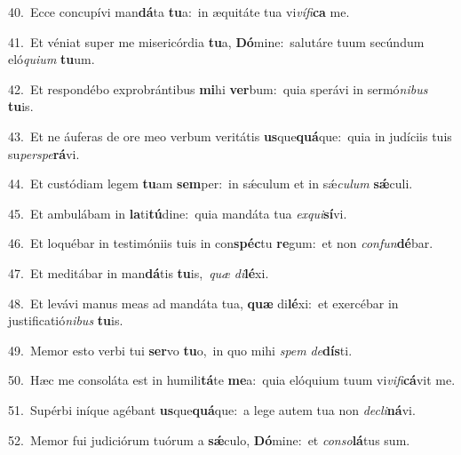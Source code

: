 {\numbfont\textcolor{\numbcolor}{40.}}~Ecce concupívi man\-\textbf{dá}\-ta \textbf{tu}\-a:~\star in æquitáte tua vi\-\textit{ví}\-\textit{fi}\textbf{ca} me.\par
{\numbfont\textcolor{\numbcolor}{41.}}~Et véniat super me misericórdia \textbf{tu}\-a, \textbf{Dó}\-mine:~\star salutáre tuum secúndum eló\-\textit{qui}\-\textit{um} \textbf{tu}\-um.\par
{\numbfont\textcolor{\numbcolor}{42.}}~Et respondébo exprobrántibus \textbf{mi}\-hi \textbf{ver}\-bum:~\star quia sperávi in sermó\-\textit{ni}\-\textit{bus} \textbf{tu}\-is.\par
{\numbfont\textcolor{\numbcolor}{43.}}~Et ne áuferas de ore meo verbum veritátis \textbf{us}\-que\-\textbf{quá}\-que:~\star quia in judíciis tuis su\-\textit{per}\-\textit{spe}\textbf{rá}vi.\par
{\numbfont\textcolor{\numbcolor}{44.}}~Et custódiam legem \textbf{tu}\-am \textbf{sem}\-per:~\star in sǽculum et in sǽ\-\textit{cu}\-\textit{lum} \textbf{sǽ}\-culi.\par
{\numbfont\textcolor{\numbcolor}{45.}}~Et ambulábam in \textbf{la}\-ti\-\textbf{tú}\-dine:~\star quia mandáta tua \textit{ex}\-\textit{qui}\textbf{sí}vi.\par
{\numbfont\textcolor{\numbcolor}{46.}}~Et loquébar in testimóniis tuis in con\-\textbf{spéc}\-tu \textbf{re}\-gum:~\star et non \textit{con}\-\textit{fun}\textbf{dé}bar.\par
{\numbfont\textcolor{\numbcolor}{47.}}~Et meditábar in man\-\textbf{dá}\-tis \textbf{tu}\-is,~\star \textit{quæ} \textit{di}\-\textbf{lé}xi.\par
{\numbfont\textcolor{\numbcolor}{48.}}~Et levávi manus meas ad mandáta tua, \textbf{quæ} di\-\textbf{lé}\-xi:~\star et exercébar in justificatió\-\textit{ni}\-\textit{bus} \textbf{tu}\-is.\par
{\numbfont\textcolor{\numbcolor}{49.}}~Memor esto verbi tui \textbf{ser}\-vo \textbf{tu}\-o,~\star in quo mihi \textit{spem} \textit{de}\-\textbf{dís}ti.\par
{\numbfont\textcolor{\numbcolor}{50.}}~Hæc me consoláta est in humili\-\textbf{tá}\-te \textbf{me}\-a:~\star quia elóquium tuum vi\-\textit{vi}\-\textit{fi}\textbf{cá}vit me.\par
{\numbfont\textcolor{\numbcolor}{51.}}~Supérbi iníque agébant \textbf{us}\-que\-\textbf{quá}\-que:~\star a lege autem tua non \textit{de}\-\textit{cli}\textbf{ná}vi.\par
{\numbfont\textcolor{\numbcolor}{52.}}~Memor fui judiciórum tuórum a \textbf{sǽ}\-culo, \textbf{Dó}\-mine:~\star et \textit{con}\-\textit{so}\textbf{lá}tus sum.\par

